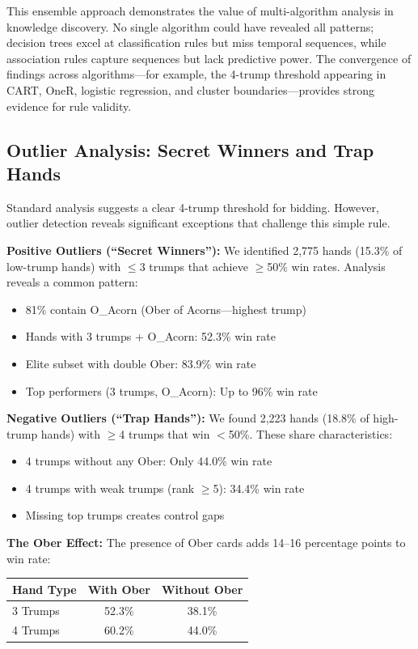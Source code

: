 \documentclass[conference]{IEEEtran}
\begin{document}
This ensemble approach demonstrates the value of multi-algorithm analysis in knowledge discovery. No single algorithm could have revealed all patterns; decision trees excel at classification rules but miss temporal sequences, while association rules capture sequences but lack predictive power. The convergence of findings across algorithms---for example, the 4-trump threshold appearing in CART, OneR, logistic regression, and cluster boundaries---provides strong evidence for rule validity.

\subsection{Outlier Analysis: Secret Winners and Trap Hands}

Standard analysis suggests a clear 4-trump threshold for bidding. However, outlier detection reveals significant exceptions that challenge this simple rule.

\textbf{Positive Outliers (``Secret Winners''):} We identified 2,775 hands (15.3\% of low-trump hands) with $\leq$3 trumps that achieve $\geq$50\% win rates. Analysis reveals a common pattern:

\begin{itemize}
    \item 81\% contain O\_Acorn (Ober of Acorns---highest trump)
    \item Hands with 3 trumps + O\_Acorn: 52.3\% win rate
    \item Elite subset with double Ober: 83.9\% win rate
    \item Top performers (3 trumps, O\_Acorn): Up to 96\% win rate
\end{itemize}

\textbf{Negative Outliers (``Trap Hands''):} We found 2,223 hands (18.8\% of high-trump hands) with $\geq$4 trumps that win $<$50\%. These share characteristics:

\begin{itemize}
    \item 4 trumps without any Ober: Only 44.0\% win rate
    \item 4 trumps with weak trumps (rank $\geq$5): 34.4\% win rate
    \item Missing top trumps creates control gaps
\end{itemize}

\textbf{The Ober Effect:} The presence of Ober cards adds 14--16 percentage points to win rate:

\begin{center}
\begin{tabular}{lcc}
\hline
\textbf{Hand Type} & \textbf{With Ober} & \textbf{Without Ober} \\
\hline
3 Trumps & 52.3\% & 38.1\% \\
4 Trumps & 60.2\% & 44.0\% \\
\hline
\end{tabular}
\end{center}
\end{document}
